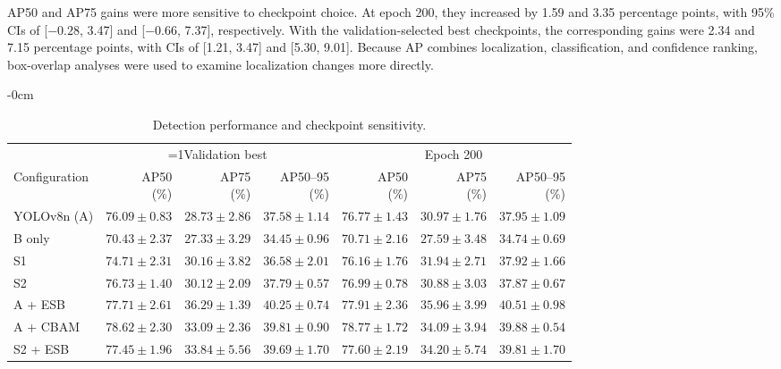 \documentclass[energies,article,submit,pdftex,moreauthors]{Definitions/mdpi}
\providecommand{\revisionmode}{0}
\newcommand{\rev}[1]{\ifnum\revisionmode=1\relax{\color{red}#1}\else#1\fi}
\begin{document}
AP50 and AP75 gains were more sensitive to checkpoint choice. At epoch 200, they increased by 1.59 and 3.35 percentage points, with 95\% CIs of [$-0.28$, 3.47] and [$-0.66$, 7.37], respectively. With the validation-selected best checkpoints, the corresponding gains were 2.34 and 7.15 percentage points, with CIs of [1.21, 3.47] and [5.30, 9.01]. Because AP combines localization, classification, and confidence ranking, box-overlap analyses were used to examine localization changes more directly.
\begin{table}[H]
\begin{adjustwidth}{-\extralength}{0cm}
\caption{Detection performance and checkpoint sensitivity.}\label{tab:detection_v12}
\centering\small\setlength{\tabcolsep}{4pt}
\begin{adjustbox}{max width=\fulllength}
\begin{tabular}{lrrrrrr}
\toprule
 & \multicolumn{3}{c}{\rev{Validation best}} & \multicolumn{3}{c}{Epoch 200} \\
\cmidrule(lr){2-4}\cmidrule(lr){5-7}
Configuration & \shortstack{AP50\\(\%)} & \shortstack{AP75\\(\%)} & \shortstack{AP50--95\\(\%)} & \shortstack{AP50\\(\%)} & \shortstack{AP75\\(\%)} & \shortstack{AP50--95\\(\%)} \\
\midrule
YOLOv8n (A) & $76.09 \pm 0.83$ & $28.73 \pm 2.86$ & $37.58 \pm 1.14$ & $76.77 \pm 1.43$ & $30.97 \pm 1.76$ & $37.95 \pm 1.09$ \\
B only & $70.43 \pm 2.37$ & $27.33 \pm 3.29$ & $34.45 \pm 0.96$ & $70.71 \pm 2.16$ & $27.59 \pm 3.48$ & $34.74 \pm 0.69$ \\
S1 & $74.71 \pm 2.31$ & $30.16 \pm 3.82$ & $36.58 \pm 2.01$ & $76.16 \pm 1.76$ & $31.94 \pm 2.71$ & $37.92 \pm 1.66$ \\
S2 & $76.73 \pm 1.40$ & $30.12 \pm 2.09$ & $37.79 \pm 0.57$ & $76.99 \pm 0.78$ & $30.88 \pm 3.03$ & $37.87 \pm 0.67$ \\
A + ESB & $77.71 \pm 2.61$ & $36.29 \pm 1.39$ & $40.25 \pm 0.74$ & $77.91 \pm 2.36$ & $35.96 \pm 3.99$ & $40.51 \pm 0.98$ \\
A + CBAM & $78.62 \pm 2.30$ & $33.09 \pm 2.36$ & $39.81 \pm 0.90$ & $78.77 \pm 1.72$ & $34.09 \pm 3.94$ & $39.88 \pm 0.54$ \\
S2 + ESB & $77.45 \pm 1.96$ & $33.84 \pm 5.56$ & $39.69 \pm 1.70$ & $77.60 \pm 2.19$ & $34.20 \pm 5.74$ & $39.81 \pm 1.70$ \\

\end{tabular}
\end{adjustbox}
\end{adjustwidth}
\end{table}
\end{document}
